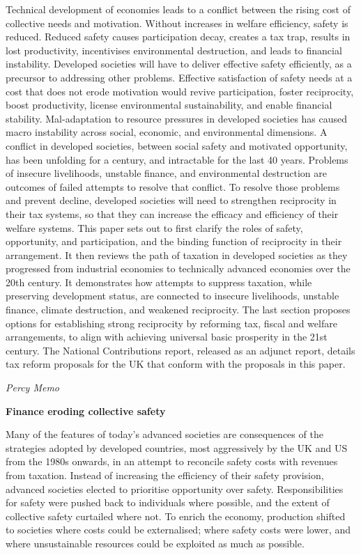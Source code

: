 \documentclass[
]{book}
\begin{document}
Technical development of economies leads to a conflict between the rising cost of collective needs and motivation. Without increases in welfare efficiency, safety is reduced. Reduced safety causes participation decay, creates a tax trap, results in lost productivity, incentivises environmental destruction, and leads to financial instability. Developed societies will have to deliver effective safety efficiently, as a precursor to addressing other problems. Effective satisfaction of safety needs at a cost that does not erode motivation would revive participation, foster reciprocity, boost productivity, license environmental sustainability, and enable financial stability. Mal-adaptation to resource pressures in developed societies has caused macro instability across social, economic, and environmental dimensions. A conflict in developed societies, between social safety and motivated opportunity, has been unfolding for a century, and intractable for the last 40 years. Problems of insecure livelihoods, unstable finance, and environmental destruction are outcomes of failed attempts to resolve that conflict. To resolve those problems and prevent decline, developed societies will need to strengthen reciprocity in their tax systems, so that they can increase the efficacy and efficiency of their welfare systems. This paper sets out to first clarify the roles of safety, opportunity, and participation, and the binding function of reciprocity in their arrangement. It then reviews the path of taxation in developed societies as they progressed from industrial economies to technically advanced economies over the 20th century. It demonstrates how attempts to suppress taxation, while preserving development status, are connected to insecure livelihoods, unstable finance, climate destruction, and weakened reciprocity. The last section proposes options for establishing strong reciprocity by reforming tax, fiscal and welfare arrangements, to align with achieving universal basic prosperity in the 21st century. The National Contributions report, released as an adjunct report, details tax reform proposals for the UK that conform with the proposals in this paper.

\emph{Percy Memo}

\textbf{Finance eroding collective safety}

Many of the features of today's advanced societies are consequences of the strategies adopted by
developed countries, most aggressively by the UK and US from the 1980s onwards, in an attempt to
reconcile safety costs with revenues from taxation.
Instead of increasing the efficiency of their safety provision, advanced societies elected to prioritise
opportunity over safety. Responsibilities for safety were pushed back to individuals where possible,
and the extent of collective safety curtailed where not. To enrich the economy, production shifted to
societies where costs could be externalised; where safety costs were lower, and where unsustainable
resources could be exploited as much as possible.
\end{document}
